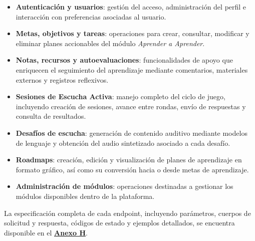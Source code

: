 \begin{itemize}
    \item \textbf{Autenticación y usuarios}: gestión del acceso, administración del perfil e
    interacción con preferencias asociadas al usuario.

    \item \textbf{Metas, objetivos y tareas}: operaciones para crear, consultar, modificar y
    eliminar planes accionables del módulo \textit{Aprender a Aprender}.

    \item \textbf{Notas, recursos y autoevaluaciones}: funcionalidades de apoyo que enriquecen
    el seguimiento del aprendizaje mediante comentarios, materiales externos y registros
    reflexivos.

    \item \textbf{Sesiones de Escucha Activa}: manejo completo del ciclo de juego, incluyendo
    creación de sesiones, avance entre rondas, envío de respuestas y consulta de resultados.

    \item \textbf{Desafíos de escucha}: generación de contenido auditivo mediante modelos de
    lenguaje y obtención del audio sintetizado asociado a cada desafío.

    \item \textbf{Roadmaps}: creación, edición y visualización de planes de aprendizaje en
    formato gráfico, así como su conversión hacia o desde metas de aprendizaje.

    \item \textbf{Administración de módulos}: operaciones destinadas a gestionar los módulos
    disponibles dentro de la plataforma.
\end{itemize}

La especificación completa de cada endpoint, incluyendo parámetros, cuerpos de
solicitud y respuesta, códigos de estado y ejemplos detallados, se encuentra
disponible en el \hyperref[anexo:endpoints]{\textbf{Anexo H}}.